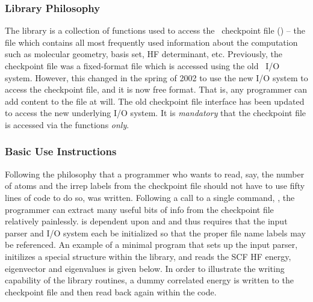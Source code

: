 \subsubsection{Library Philosophy}

The  library is a collection of functions used to
access the \PSIthree\ checkpoint file () -- the file which
contains all most frequently used information about the computation
such as molecular geometry, basis set, HF determinant, etc.
Previously, the checkpoint file was a fixed-format file which is
accessed using the old \PSIthree\ I/O system.  However, this changed
in the spring of 2002 to use the new  I/O system to
access the checkpoint file, and it is now free format.  That is, any
programmer can add content to the file at will.  The old checkpoint
file interface has been updated to access the new underlying I/O
system.  It is {\em mandatory} that the checkpoint file is accessed
via the  functions {\em only}.

\subsubsection{Basic Use Instructions}
Following the philosophy that a programmer who wants to read, say, the
number of atoms and the irrep labels from the checkpoint file should
not have to use fifty lines of code to do so,  was
written.  Following a call to a single command, ,
the programmer can extract many useful bits of info from the checkpoint file
relatively painlessly.   is dependent upon
 and  and thus requires that the
input parser and I/O system each be initialized so that the proper
file name labels may be referenced.  An example of a minimal program
that sets up the input parser, initilizes a special structure within
the  library, and reads the SCF HF energy,
eigenvector and eigenvalues is given below.  In order to illustrate
the writing capability of the library routines, a dummy correlated
energy is written to the checkpoint file and then read back again
within the code.

